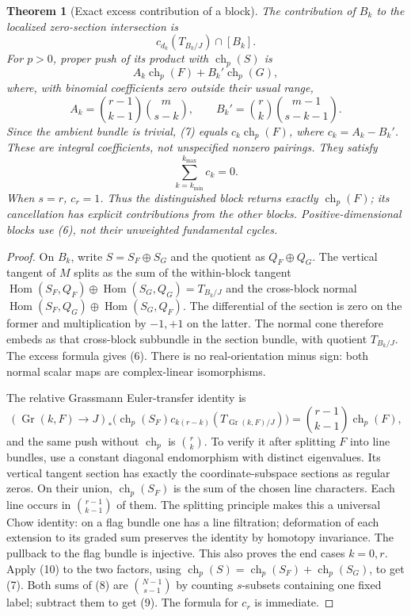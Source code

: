 \documentclass[11pt]{article}
\newtheorem{theorem}{Theorem}
\newcommand{\ch}{\operatorname{ch}}
\newcommand{\Gr}{\operatorname{Gr}}
\newcommand{\Hom}{\operatorname{Hom}}
\begin{document}
\begin{theorem}[Exact excess contribution of a block]
The contribution of $B_k$ to the localized zero-section intersection is
\[
 c_{d_k}(T_{B_k/J})\cap[B_k].                           \tag{6}
\]
For $p>0$, proper push of its product with $\ch_p(S)$ is
\[
 A_k\ch_p(F)+B_k'\ch_p(G),                             \tag{7}
\]
where, with binomial coefficients zero outside their usual range,
\[
 A_k=\binom{r-1}{k-1}\binom m{s-k},\qquad
 B_k'=\binom rk\binom{m-1}{s-k-1}.                     \tag{8}
\]
Since the ambient bundle is trivial, (7) equals
$c_k\ch_p(F)$, where $c_k=A_k-B_k'$. These are integral coefficients,
not unspecified nonzero pairings. They satisfy
\[
 \sum_{k=k_{\min}}^{k_{\max}}c_k=0.                    \tag{9}
\]
When $s=r$, $c_r=1$. Thus the distinguished block returns exactly
$\ch_p(F)$; its cancellation has explicit contributions from the other
blocks. Positive-dimensional blocks use (6), not their unweighted
fundamental cycles.
\end{theorem}
\begin{proof}
On $B_k$, write $S=S_F\oplus S_G$ and the quotient as $Q_F\oplus Q_G$.
The vertical tangent of $M$ splits as the sum of the within-block tangent
$\Hom(S_F,Q_F)\oplus\Hom(S_G,Q_G)=T_{B_k/J}$ and the cross-block normal
$\Hom(S_F,Q_G)\oplus\Hom(S_G,Q_F)$. The differential of the section is
zero on the former and multiplication by $-1,+1$ on the latter.
The normal cone therefore embeds as that cross-block subbundle in the
section bundle, with quotient $T_{B_k/J}$. The excess formula gives (6).
There is no real-orientation minus sign: both normal scalar maps are
complex-linear isomorphisms.

The relative Grassmann Euler-transfer identity is
\[
 (\Gr(k,F)\to J)_*\bigl(\ch_p(S_F)c_{k(r-k)}(T_{\Gr(k,F)/J})\bigr)
   =\binom{r-1}{k-1}\ch_p(F),                          \tag{10}
\]
and the same push without $\ch_p$ is $\binom rk$.
To verify it after splitting $F$ into line bundles, use a constant diagonal
endomorphism with distinct eigenvalues. Its vertical tangent section has
exactly the coordinate-subspace sections as regular zeros. On their union,
$\ch_p(S_F)$ is the sum of the chosen line characters. Each line occurs
in $\binom{r-1}{k-1}$ of them. The splitting principle makes this a universal
Chow identity: on a flag bundle one has a line filtration; deformation
of each extension to its graded sum preserves the identity by homotopy
invariance. The pullback to the flag bundle is injective. This also proves
the end cases $k=0,r$. Apply (10) to the two factors, using
$\ch_p(S)=\ch_p(S_F)+\ch_p(S_G)$, to get (7).
Both sums of (8) are $\binom{N-1}{s-1}$ by counting $s$-subsets containing
one fixed label; subtract them to get (9). The formula for $c_r$ is immediate.
\end{proof}
\end{document}
